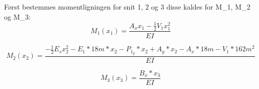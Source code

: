



Først bestemmes momentligningen for snit 1, 2 og 3 disse kaldes for M_1, M_2 og M_3:
\begin{equation}
    M_1(x_1)=\frac{A_xx_1-\frac{1}{2}V_1x_1^2}{EI}
\end{equation}

\begin{equation}
    M_2(x_2)=\frac{-\frac{1}{2}E_sx_2^2-E_1*18m*x_2-P_1_y*x_2+A_y*x_2-A_x*18m-V_1*162m^2}{EI}
\end{equation}

\begin{equation}
    M_3(x_3)=\frac{B_x*x_3}{EI}
\end{equation}
